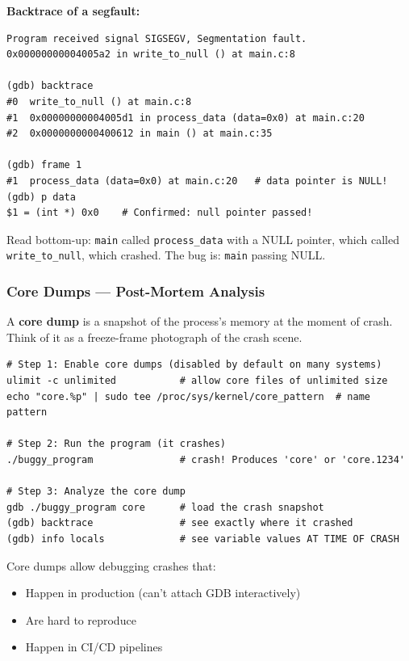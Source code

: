 \documentclass[11pt,a4paper]{article}
\newcommand{\code}[1]{\texttt{\small\colorbox{codebg}{\color{codekw}#1}}}
\newcommand{\term}[1]{\textbf{\color{darkblue}#1}}
\begin{document}
\begin{myexample}
\textbf{Backtrace of a segfault:}
\begin{lstlisting}[style=bashstyle]
Program received signal SIGSEGV, Segmentation fault.
0x00000000004005a2 in write_to_null () at main.c:8

(gdb) backtrace
#0  write_to_null () at main.c:8
#1  0x00000000004005d1 in process_data (data=0x0) at main.c:20
#2  0x0000000000400612 in main () at main.c:35

(gdb) frame 1
#1  process_data (data=0x0) at main.c:20   # data pointer is NULL!
(gdb) p data
$1 = (int *) 0x0    # Confirmed: null pointer passed!
\end{lstlisting}
Read bottom-up: \code{main} called \code{process\_data} with a NULL pointer, which called \code{write\_to\_null}, which crashed. The bug is: \code{main} passing NULL.
\end{myexample}

\subsubsection{Core Dumps --- Post-Mortem Analysis}

A \term{core dump} is a snapshot of the process's memory at the moment of crash. Think of it as a freeze-frame photograph of the crash scene.

\begin{lstlisting}[style=bashstyle]
# Step 1: Enable core dumps (disabled by default on many systems)
ulimit -c unlimited           # allow core files of unlimited size
echo "core.%p" | sudo tee /proc/sys/kernel/core_pattern  # name pattern

# Step 2: Run the program (it crashes)
./buggy_program               # crash! Produces 'core' or 'core.1234'

# Step 3: Analyze the core dump
gdb ./buggy_program core      # load the crash snapshot
(gdb) backtrace               # see exactly where it crashed
(gdb) info locals             # see variable values AT TIME OF CRASH
\end{lstlisting}

Core dumps allow debugging crashes that:
\begin{itemize}[noitemsep]
  \item Happen in production (can't attach GDB interactively)
  \item Are hard to reproduce
  \item Happen in CI/CD pipelines
\end{itemize}
\end{document}
